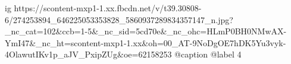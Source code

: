  
 
 
 
 


\ifcmt
  ig https://scontent-mxp1-1.xx.fbcdn.net/v/t39.30808-6/274253894_646225053353828_5860937289834357147_n.jpg?_nc_cat=102&ccb=1-5&_nc_sid=5cd70e&_nc_ohc=HLmP0BH0NMwAX-YmI47&_nc_ht=scontent-mxp1-1.xx&oh=00_AT-9NoDgOE7hDK5Yu3vyk-4OlawutIKv1p_aJV_PxipZUg&oe=62158253
	@caption @label 4
\fi
